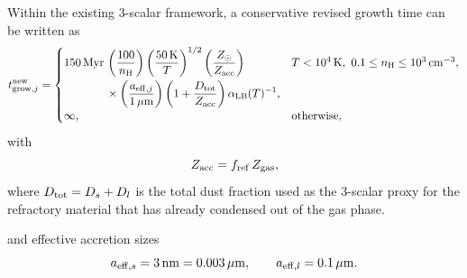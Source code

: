 \documentclass[11pt]{article}
\begin{document}
Within the existing 3-scalar framework, a conservative revised growth time can be written as
\begin{equation}
t_{{\rm grow},j}^{\rm new} =
\begin{cases}
150\,{\rm Myr}\,
\begin{aligned}[t]
&\left(\dfrac{100}{n_{\rm H}}\right)
\left(\dfrac{50\,{\rm K}}{T}\right)^{1/2}
\left(\dfrac{Z_\odot}{Z_{\rm acc}}\right)\\
&\times
\left(\dfrac{a_{{\rm eff},j}}{1\,\mu{\rm m}}\right)
\left(1+\dfrac{D_{\rm tot}}{Z_{\rm acc}}\right)
\alpha_{\rm LB}(T)^{-1},
\end{aligned}
& T<10^4\,{\rm K},\ 0.1\le n_{\rm H}\le 10^3\,{\rm cm^{-3}},\\[1.2em]
\infty, & \text{otherwise},
\end{cases}
\label{eq:proposed_tgrow}
\end{equation}
with
\begin{equation}
Z_{\rm acc}=f_{\rm ref}\,Z_{\rm gas},
\label{eq:zacc}
\end{equation}
where $D_{\rm tot}=D_s+D_l$ is the total dust fraction used as the 3-scalar proxy for the refractory material that has already condensed out of the gas phase.

and effective accretion sizes
\begin{equation}
a_{{\rm eff},s}=3\,{\rm nm}=0.003\,\mu{\rm m},
\qquad
a_{{\rm eff},l}=0.1\,\mu{\rm m}.
\label{eq:aeff}
\end{equation}
\end{document}
